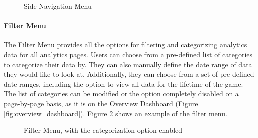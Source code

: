 \begin{figure}[htb]
	\caption[Analytics Site: Side Navigation Menu]{\label{fig:nav_menu} Side Navigation Menu}
\end{figure}

\paragraph{Filter Menu}

The Filter Menu provides all the options for filtering and categorizing analytics data for all analytics pages. Users can choose from a pre-defined list of categories to categorize their data by. They can also manually define the date range of data they would like to look at. Additionally, they can choose from a set of pre-defined date ranges, including the option to view all data for the lifetime of the game. The list of categories can be modified or the option completely disabled on a page-by-page basis, as it is on the Overview Dashboard (Figure \ref{fig:overview_dashboard}). Figure \ref{fig:filter_menu} shows an example of the filter menu. 

\begin{figure}[htb]
	\caption[Analytics Site: Filter Menu]{\label{fig:filter_menu} Filter Menu, with the categorization option enabled}
\end{figure}

